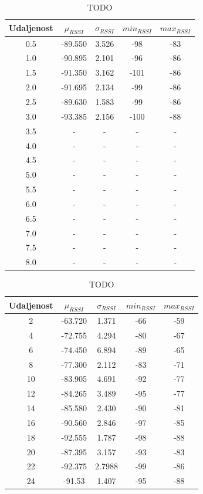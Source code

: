 \begin{table}
	\centering
	\caption{TODO}
	\label{tbl:blucatsDefault}
	\begin{tabular}{ccccc}
	\hline
	Udaljenost & $\mu_{RSSI}$ & $\sigma_{RSSI}$ & $min_{RSSI}$ & $max_{RSSI}$ \\
	\hline
	0.5 & -89.550 & 3.526 & -98 & -83 \\
	1.0 & -90.895 & 2.101 & -96 & -86 \\
	1.5 & -91.350 & 3.162 & -101 & -86 \\
	2.0 & -91.695 & 2.134 & -99 & -86 \\
	2.5 & -89.630 & 1.583 & -99 & -86 \\
	3.0 & -93.385 & 2.156 & -100 & -88 \\
	3.5 & - & - & - & - \\
	4.0 & - & - & - & - \\
	4.5 & - & - & - & - \\
	5.0 & - & - & - & - \\
	5.5 & - & - & - & - \\
	6.0 & - & - & - & - \\
	6.5 & - & - & - & - \\
	7.0 & - & - & - & - \\
	7.5 & - & - & - & - \\
	8.0 & - & - & - & - \\
	\hline
	\end{tabular}
\end{table}




\begin{table}
    \centering
    \caption{TODO}
    \label{tbl:velikaUdaljenost}
    \begin{tabular}{ccccc}
    \hline 
    Udaljenost & $\mu_{RSSI}$ & $\sigma_{RSSI}$ & $min_{RSSI}$ & $max_{RSSI}$ \\ 
    \hline 
    2 & -63.720 & 1.371 & -66 & -59 \\ 
    4 & -72.755 & 4.294 & -80 & -67 \\ 
    6 & -74.450 & 6.894 & -89 & -65 \\ 
    8 & -77.300 & 2.112 & -83 & -71 \\ 
    10 & -83.905 & 4.691 & -92 & -77 \\ 
    12 & -84.265 & 3.489 & -95 & -77 \\ 
    14 & -85.580 & 2.430 & -90 & -81 \\ 
    16 & -90.560 & 2.846 & -97 & -85 \\ 
    18 & -92.555 & 1.787 & -98 & -88 \\ 
    20 & -87.395 & 3.157 & -93 & -83 \\ 
    22 & -92.375 & 2.7988 & -99 & -86 \\ 
    24 & -91.53 & 1.407 & -95 & -88 \\ 
    \hline 
    \end{tabular} 
\end{table}


